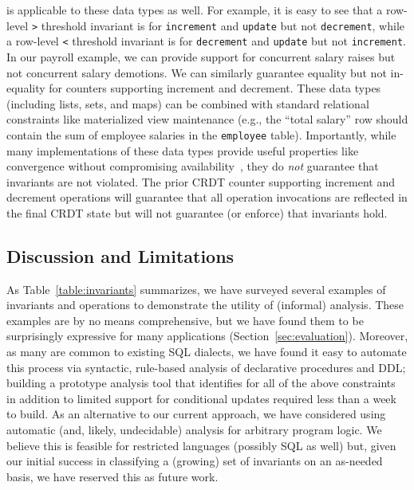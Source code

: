 \iconfluence is applicable to these data types as well. For example,
it is easy to see that a row-level \texttt{>} threshold invariant is
\iconfluent for \texttt{increment} and \texttt{update} but not
\texttt{decrement}, while a row-level \texttt{<} threshold invariant
is \iconfluent for \texttt{decrement} and \texttt{update} but not
\texttt{increment}. In our payroll example, we can provide \cfree
support for concurrent salary raises but not concurrent salary
demotions. We can similarly guarantee equality but not in-equality for
counters supporting increment and decrement. These data types
(including lists, sets, and maps) can be combined with standard
relational constraints like materialized view maintenance (e.g., the
``total salary'' row should contain the sum of employee salaries in
the \texttt{employee} table). Importantly, while many implementations
of these data types provide useful properties like convergence without
compromising availability~\cite{blooml,crdt}, they do \textit{not}
guarantee that invariants are not violated. The prior CRDT counter
supporting increment and decrement operations will guarantee that all
operation invocations are reflected in the final CRDT state but will
not guarantee (or enforce) that invariants hold.

\subsection{Discussion and Limitations}

As Table~\ref{table:invariants} summarizes, we have surveyed several
examples of invariants and operations to demonstrate the utility of
(informal) \iconfluence analysis. These examples are by no means
comprehensive, but we have found them to be surprisingly expressive
for many applications (Section~\ref{sec:evaluation}). Moreover, as
many are common to existing SQL dialects, we have found it easy to
automate this process via syntactic, rule-based analysis of
declarative procedures and DDL; building a prototype analysis tool
that identifies \iconfluence for all of the above constraints in
addition to limited support for conditional updates required less than
a week to build. As an alternative to our current approach, we have
considered using automatic (and, likely, undecidable) analysis for
arbitrary program logic. We believe this is feasible for restricted
languages (possibly SQL as well) but, given our initial success in
classifying a (growing) set of invariants on an as-needed basis, we
have reserved this as future work.

